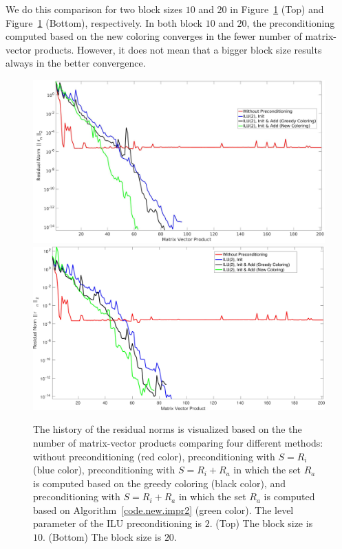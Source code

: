 \documentclass[12pt, twoside,a4paper,toc=bibliography]{scrbook}
\newcommand{\coderef}[1]{Algorithm~\protect\ref{#1}}
\begin{document}
We do this comparison for two block sizes $10$ and $20$ in
Figure~\ref{f.convergence_greedy_new2} (Top) and
Figure~\ref{f.convergence_greedy_new2} (Bottom), respectively.
In both block $10$ and $20$, the preconditioning computed based
on the new coloring converges in the fewer number of matrix-vector products.
However, it does not mean that a bigger block size results always in the 
better convergence.
\begin{figure}
\centering
\includegraphics[width=\linewidth]{jac_convergence_greedy_new.jpg}
\includegraphics[width=\linewidth]{jac_convergence_greedy_new_bl20.jpg}
\caption{
The history of the residual norms is visualized based on the 
the number of matrix-vector products comparing four different methods:
without preconditioning (red color), 
preconditioning with $S=R_i$ (blue color),
preconditioning with $S=R_i + R_a$ in which 
the set $R_a$ is computed based on the greedy coloring (black color),
and preconditioning with $S=R_i + R_a$ in which 
the set $R_a$ is computed based on \coderef{code.new.impr2} (green color).
The level parameter of the ILU preconditioning is $2$.
(Top) The block size is $10$. 
(Bottom) The block size is $20$.
}
\label{f.convergence_greedy_new2}
\end{figure}
\end{document}
